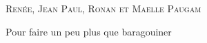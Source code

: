 \begin{titlepage} %
	
	\centering %
	
	
	
	
	
	
	\vspace{0.1\textheight} %
	
	{\Large \textsc{Renée, Jean Paul, Ronan et Maëlle Paugam}} %
	
	\vspace{0.2\textheight} %
	

	\color{black}	
	\vspace{0.04\textheight} %
	
	{\large Pour faire un peu plus que baragouiner}
	
	\vspace{0.2\textheight} %
	
	


\end{titlepage}
